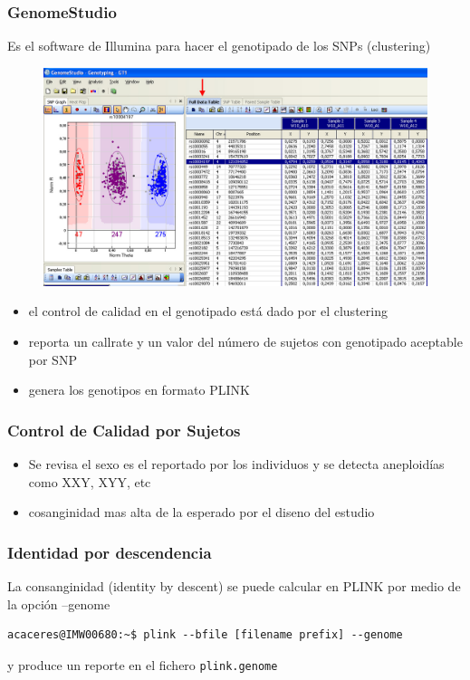 \documentclass{beamer}\usepackage[]{graphicx}\usepackage[]{color}
\begin{document}
\begin{frame}[fragile]
\frametitle{GenomeStudio}

Es el software de Illumina para hacer el genotipado de los SNPs (clustering)
\begin{figure}[htbp]
\begin{center}
\includegraphics[width=.6\linewidth]{genomestudio.jpg}
\end{center}
\end{figure}

\begin{itemize}
\item el control de calidad en el genotipado est\'a dado por el clustering
\item reporta un callrate y un valor del n\'umero de sujetos con genotipado aceptable por SNP 
\item genera los genotipos en formato PLINK 
\end{itemize}

\end{frame}


\begin{frame}[fragile]
\frametitle{Control de Calidad por Sujetos}

\begin{itemize}
\item Se revisa el sexo es el reportado por los individuos y se  detecta aneploid\'ias como XXY, XYY, etc 
\item cosanginidad mas alta de la esperado por el diseno del estudio 
\end{itemize}

\end{frame}


\begin{frame}[fragile]
\frametitle{Identidad por descendencia}

La consanginidad (identity by descent) se puede calcular en PLINK por medio de la opci\'on --genome

{\scriptsize
\begin{verbatim}
acaceres@IMW00680:~$ plink --bfile [filename prefix] --genome 
\end{verbatim}
}
y produce un reporte en el fichero {\tt plink.genome}
\end{frame}
\end{document}
